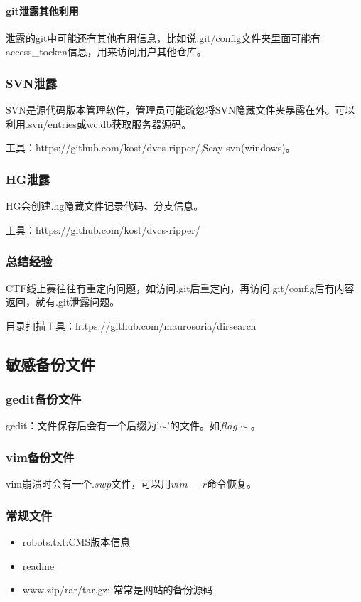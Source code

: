 \paragraph*{git泄露其他利用}
泄露的git中可能还有其他有用信息，比如说.git/config文件夹里面可能有access\_tocken信息，用来访问用户其他仓库。

\subsubsection*{SVN泄露}
SVN是源代码版本管理软件，管理员可能疏忽将SVN隐藏文件夹暴露在外。可以利用.svn/entries或wc.db获取服务器源码。

工具：https://github.com/kost/dvcs-ripper/,Seay-svn(windows)。


\subsubsection*{HG泄露}
HG会创建.hg隐藏文件记录代码、分支信息。

工具：https://github.com/kost/dvcs-ripper/

\subsubsection*{总结经验}

CTF线上赛往往有重定向问题，如访问.git后重定向，再访问.git/config后有内容返回，就有.git泄露问题。

目录扫描工具：https://github.com/maurosoria/dirsearch

\subsection{敏感备份文件}

\subsubsection*{gedit备份文件}
gedit：文件保存后会有一个后缀为'$\sim$'的文件。如$flag\sim$。

\subsubsection*{vim备份文件}
vim崩溃时会有一个$.swp$文件，可以用$vim\ -r$命令恢复。

\subsubsection*{常规文件}
\begin{itemize}
    \item robots.txt:CMS版本信息
    \item readme
    \item www.zip/rar/tar.gz: 常常是网站的备份源码
\end{itemize}



